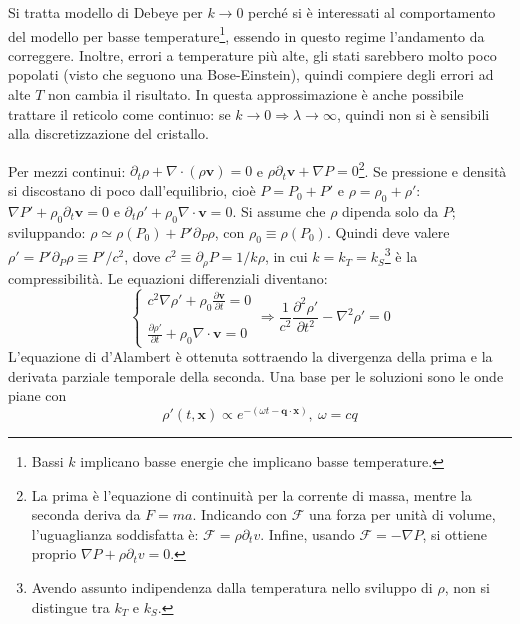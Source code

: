 \documentclass[10pt, a4paper]{scrartcl}
\numberwithin{equation}{subsection}
\theoremstyle{style1}
\theoremstyle{style2}
\begin{document}
Si tratta modello di Debeye per $k\to 0$ perch\'e si \`e interessati al comportamento del modello per basse temperature\footnote{Bassi $k$ implicano basse energie che implicano basse temperature.}, essendo in questo regime l'andamento da correggere. 
Inoltre, errori a temperature pi\`u alte, gli stati sarebbero molto poco popolati (visto che seguono una Bose-Einstein), quindi compiere degli errori ad alte $T$ non cambia il risultato.
In questa approssimazione \`e anche possibile trattare il reticolo come continuo: se $k\to 0 \Rightarrow  \lambda \to \infty$, quindi non si \`e sensibili alla discretizzazione del cristallo.

Per mezzi continui: $\partial _t \rho  + \nabla \cdot  (\rho  \mathbf{v} ) = 0$ e $\rho  \partial _t \mathbf{ v}  + \nabla P = 0$\footnote{La prima \`e l'equazione di continuit\`a per la corrente di massa, mentre la seconda deriva da $F=ma$. Indicando con $\mathcal{F}$ una forza per unit\`a di volume, l'uguaglianza soddisfatta \`e: $\mathcal{F} = \rho \partial _t v$. Infine, usando $\mathcal{F}=-\nabla P$, si ottiene proprio $\nabla P +\rho \partial _t v = 0$.}.
Se pressione e densit\`a si discostano di poco dall'equilibrio, cio\`e $P = P_0 + P'$ e $\rho  = \rho _0 + \rho '$: $\nabla P' + \rho _0 \partial _t \mathbf{v} = 0$ e $\partial _t \rho ' + \rho _0 \nabla \cdot \mathbf{v} =0$.
Si assume che $\rho $ dipenda solo da $P$; sviluppando: $\rho \simeq \rho (P_0) + P'\partial _P \rho $, con $\rho _0 \equiv \rho (P_0)$. Quindi deve valere $\rho ' = P'\partial _P \rho  \equiv P ' / c^2$, dove $c^2 \equiv \partial _\rho P = 1 / k\rho $, in cui $k = k_T = k_S$\footnote{Avendo assunto indipendenza dalla temperatura nello sviluppo di $\rho $, non si distingue tra $k _T$ e $k_S$.} \`e la compressibilit\`a.
Le equazioni differenziali diventano:
\begin{equation}
	\begin{cases}
		\displaystyle c^2 \nabla  \rho  ' + \rho _0 \frac{\partial \mathbf{v} }{\partial t} = 0 \\
		\\
		 \displaystyle \frac{\partial \rho '}{\partial t} + \rho _0 \nabla \cdot \mathbf{v} = 0 
	\end{cases} \Longrightarrow \frac{1}{c^2}\frac{\partial ^2 \rho '}{\partial t^2} - \nabla ^2 \rho ' = 0
\end{equation}
L'equazione di d'Alambert \`e ottenuta sottraendo la divergenza della prima e la derivata parziale temporale della seconda.
Una base per le soluzioni sono le onde piane con
\begin{equation}
	\rho '(t,\mathbf{x} ) \propto e^{- (\omega t - \mathbf{q} \cdot \mathbf{x} )} , \ \omega = cq
\end{equation}
\end{document}
